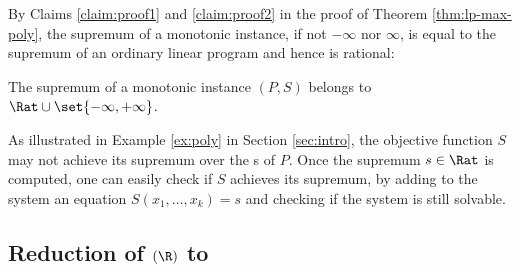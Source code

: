 By Claims \ref{claim:proof1} and \ref{claim:proof2} in the proof of Theorem \ref{thm:lp-max-poly},
the supremum of a monotonic instance, if not  $-\infty$ nor $\infty$,
is equal to the supremum of an ordinary linear program and hence is rational:
\begin{corollary} \label{cor:limQ}
The supremum of a monotonic instance $(P,S)$ belongs to $\Rat\cup\set{-\infty,+\infty}$. 
\end{corollary}

\begin{slremark}
As illustrated in Example \ref{ex:poly} in Section \ref{sec:intro}, 
the objective function $S$ may not achieve its supremum over the {\aasol}s of $P$.
Once the supremum $s\in \Rat$ is computed, 
one can easily check if $S$ achieves its supremum, by adding to the system an equation
$S(x_1, \ldots, x_k) = s$ and checking if the system is still solvable.
\end{slremark}

\subsection{Reduction of \finineqmaxname$(\R)$ to  \allpolyineqmaxname}



